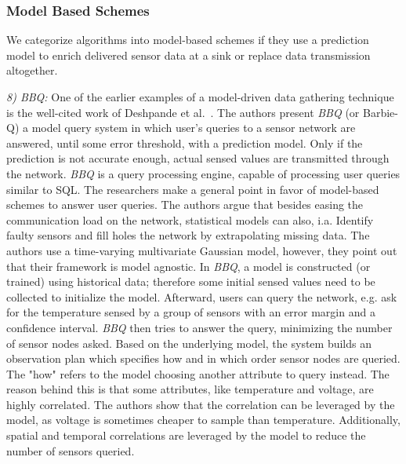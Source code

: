 \subsubsection{Model Based Schemes}
\label{sec:Model Based Schemes}

We categorize algorithms into model-based schemes if they use a prediction
model to enrich delivered sensor data at a sink or replace data transmission
altogether. 

\textit{8) BBQ:}
One of the earlier examples of a model-driven data gathering technique is the
well-cited work of Deshpande et al.~\cite{deshpande2004model}. The authors
present \textit{BBQ} (or Barbie-Q) a model query system in which user's queries
to a sensor network are answered, until some error threshold, with a prediction
model. Only if the prediction is not accurate enough, actual sensed values are
transmitted through the network. \textit{BBQ} is a query processing engine,
capable of processing user queries similar to \ac{SQL}. The researchers make a
general point in favor of model-based schemes to answer user queries. The
authors argue that besides easing the communication load on the network,
statistical models can also, i.a. Identify faulty sensors and fill holes the
network by extrapolating missing data. The authors use a time-varying
multivariate Gaussian model, however, they point out that their framework is
model agnostic. In \textit{BBQ}, a model is constructed (or trained) using
historical data; therefore some initial sensed values need to be collected to
initialize the model. Afterward, users can query the network, e.g. ask for the
temperature sensed by a group of sensors with an error margin and a confidence
interval. \textit{BBQ} then tries to answer the query, minimizing the number of
sensor nodes asked. Based on the underlying model, the system builds an
observation plan which specifies how and in which order sensor nodes are
queried. The "how" refers to the model choosing another attribute to query
instead. The reason behind this is that some attributes, like temperature and
voltage, are highly correlated. The authors show that the correlation can be
leveraged by the model, as voltage is sometimes cheaper to sample than
temperature. Additionally, spatial and temporal correlations are leveraged by
the model to reduce the number of sensors queried.


